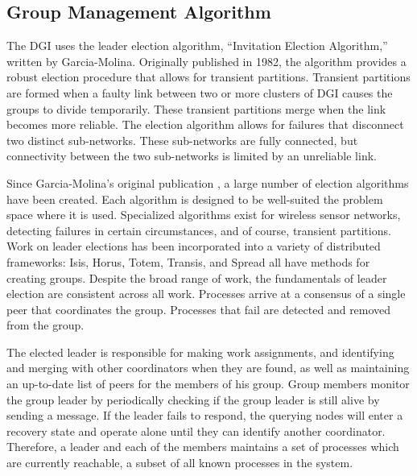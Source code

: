 \subsection{Group Management Algorithm}

The DGI uses the leader election algorithm, ``Invitation Election Algorithm,'' written by Garcia-Molina\cite{INVITATIONELECTION}.
Originally published in 1982, the algorithm provides a robust election procedure that allows for transient partitions.
Transient partitions are formed when a faulty link between two or more clusters of \ac{DGI} causes the groups to divide temporarily.
These transient partitions merge when the link becomes more reliable.
The election algorithm allows for failures that disconnect two distinct sub-networks.
These sub-networks are fully connected, but connectivity between the two sub-networks is limited by an unreliable link.

Since Garcia-Molina's original publication \cite{INVITATIONELECTION}, a large number of election algorithms have been created. 
Each algorithm is designed to be well-suited the problem space where it is used.
Specialized algorithms exist for wireless sensor networks\cite{LE-WSN-1}\cite{LE-WSN-2}, detecting failures in certain circumstances\cite{LE-SPECIALCIRCUMSTANCES-1}\cite{LE-SPECIALCIRCUMSTANCES-2}, and of course, transient partitions.
Work on leader elections has been incorporated into a variety of distributed frameworks: Isis\cite{ISISTOOLKIT}, Horus\cite{HORUSTOOLKIT}, Totem\cite{TOTEMTOOLKIT}, Transis\cite{TRANSISTOOLKIT}, and Spread\cite{SPREADTOOLKIT} all have methods for creating groups.
Despite the broad range of work, the fundamentals of leader election are consistent
across all work.
Processes arrive at a consensus of a single peer that coordinates the group.
Processes that fail are detected and removed from the group. 

The elected leader is responsible for making work assignments, and identifying and merging with other coordinators when they are found, as well as maintaining an up-to-date list of peers for the members of his group. 
Group members monitor the group leader by periodically checking if the group leader is still alive by sending a message. 
If the leader fails to respond, the querying nodes will enter a recovery state and operate alone until
they can identify another coordinator.
Therefore, a leader and each of the members maintains a set of processes which are currently reachable, a subset of all known processes in the system.


